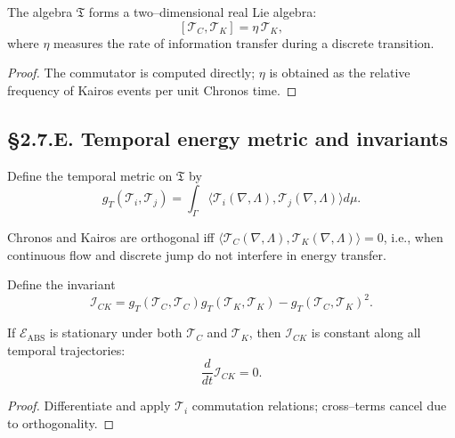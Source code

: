 \begin{theorem}\label{thm:2.7.lie}
The algebra $\mathfrak{T}$ forms a two–dimensional real Lie algebra:
\[
[\mathcal{T}_C,\mathcal{T}_K]=\eta\,\mathcal{T}_K,
\]
where $\eta$ measures the rate of information transfer during a discrete transition.
\end{theorem}

\begin{proof}
The commutator is computed directly; $\eta$ is obtained as the relative frequency of Kairos events per unit Chronos time.
\end{proof}

\subsection*{§2.7.E. Temporal energy metric and invariants}

\begin{definition}
Define the temporal metric on $\mathfrak{T}$ by
\[
g_T(\mathcal{T}_i,\mathcal{T}_j)
=\int_\Gamma \langle \mathcal{T}_i(\nabla,\Lambda),\mathcal{T}_j(\nabla,\Lambda)\rangle d\mu.
\]
\]
\end{definition}

\begin{lemma}
Chronos and Kairos are orthogonal iff $\langle\mathcal{T}_C(\nabla,\Lambda),\mathcal{T}_K(\nabla,\Lambda)\rangle=0$,  
i.e., when continuous flow and discrete jump do not interfere in energy transfer.
\end{lemma}

\begin{definition}
Define the invariant
\[
\mathcal{I}_{CK}=g_T(\mathcal{T}_C,\mathcal{T}_C)g_T(\mathcal{T}_K,\mathcal{T}_K)-g_T(\mathcal{T}_C,\mathcal{T}_K)^2.
\]
\]
\end{definition}

\begin{theorem}\label{thm:2.7.invariance}
If $\mathcal{E}_{\mathrm{ABS}}$ is stationary under both $\mathcal{T}_C$ and $\mathcal{T}_K$,  
then $\mathcal{I}_{CK}$ is constant along all temporal trajectories:
\[
\frac{d}{dt}\mathcal{I}_{CK}=0.
\]
\]
\end{theorem}

\begin{proof}
Differentiate and apply $\mathcal{T}_i$ commutation relations; cross–terms cancel due to orthogonality.
\end{proof}

